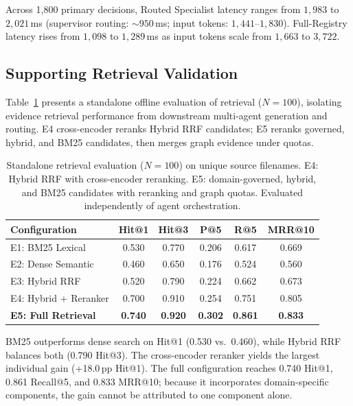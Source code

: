 Across 1,800 primary decisions, Routed Specialist latency ranges from $1{,}983$ to $2{,}021$\,ms (supervisor routing: ${\sim}950$\,ms; input tokens: $1{,}441$--$1{,}830$). Full-Registry latency rises from $1{,}098$ to $1{,}289$\,ms as input tokens scale from $1{,}663$ to $3{,}722$.

\subsection{Supporting Retrieval Validation}
\label{sec:retrieval_results}

Table~\ref{tab:retrieval_evaluation} presents a standalone offline evaluation of retrieval ($N{=}100$), isolating evidence retrieval performance from downstream multi-agent generation and routing. E4 cross-encoder reranks Hybrid RRF candidates; E5 reranks governed, hybrid, and BM25 candidates, then merges graph evidence under quotas.

\begin{table}[!htbp]
\centering
\caption{Standalone retrieval evaluation ($N{=}100$) on unique source filenames. E4: Hybrid RRF with cross-encoder reranking. E5: domain-governed, hybrid, and BM25 candidates with reranking and graph quotas. Evaluated independently of agent orchestration.}
\label{tab:retrieval_evaluation}
{\small\setlength{\tabcolsep}{5pt}
\begin{tabular}{lccccc}
\toprule
\textbf{Configuration} & \textbf{Hit@1} & \textbf{Hit@3} & \textbf{P@5} & \textbf{R@5} & \textbf{MRR@10} \\
\midrule
E1: BM25 Lexical          & 0.530 & 0.770 & 0.206 & 0.617 & 0.669 \\
E2: Dense Semantic        & 0.460 & 0.650 & 0.176 & 0.524 & 0.560 \\
E3: Hybrid RRF            & 0.520 & 0.790 & 0.224 & 0.662 & 0.673 \\
E4: Hybrid + Reranker     & 0.700 & 0.910 & 0.254 & 0.751 & 0.805 \\
\textbf{E5: Full Retrieval} & \textbf{0.740} & \textbf{0.920} & \textbf{0.302} & \textbf{0.861} & \textbf{0.833} \\
\bottomrule
\end{tabular}}
\end{table}

BM25 outperforms dense search on Hit@1 (0.530 vs.\ 0.460), while Hybrid RRF balances both (0.790 Hit@3). The cross-encoder reranker yields the largest individual gain (+18.0\,pp Hit@1). The full configuration reaches 0.740 Hit@1, 0.861 Recall@5, and 0.833 MRR@10; because it incorporates domain-specific components, the gain cannot be attributed to one component alone.

